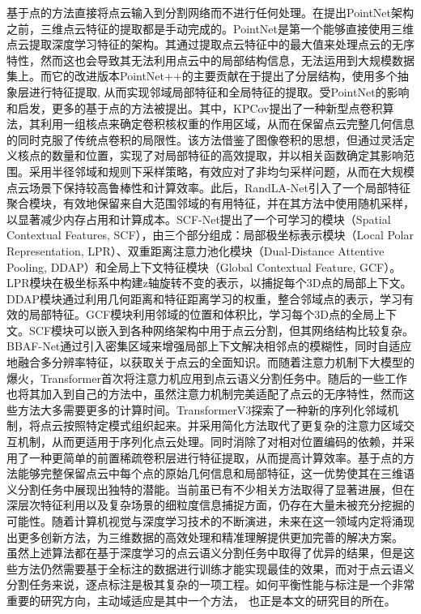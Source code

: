 基于点的方法直接将点云输入到分割网络而不进行任何处理。在提出PointNet架构之前，三维点云特征的提取都是手动完成的。PointNet是第一个能够直接使用三维点云提取深度学习特征的架构。其通过提取点云特征中的最大值来处理点云的无序特性，然而这也会导致其无法利用点云中的局部结构信息，无法运用到大规模数据集上。而它的改进版本PointNet++的主要贡献在于提出了分层结构，使用多个抽象层进行特征提取, 从而实现邻域局部特征和全局特征的提取。受PointNet的影响和启发，更多的基于点的方法被提出。其中，KPCov提出了一种新型点卷积算法，其利用一组核点来确定卷积核权重的作用区域，从而在保留点云完整几何信息的同时克服了传统点卷积的局限性。该方法借鉴了图像卷积的思想，但通过灵活定义核点的数量和位置，实现了对局部特征的高效提取，并以相关函数确定其影响范围。采用半径邻域和规则下采样策略，有效应对了非均匀采样问题，从而在大规模点云场景下保持较高鲁棒性和计算效率。此后，RandLA-Net引入了一个局部特征聚合模块，有效地保留来自大范围邻域的有用特征，并在其方法中使用随机采样，以显著减少内存占用和计算成本。SCF-Net提出了一个可学习的模块（Spatial Contextual Features, SCF），由三个部分组成：局部极坐标表示模块（Local Polar Representation, LPR）、双重距离注意力池化模块（Dual-Distance Attentive Pooling, DDAP）和全局上下文特征模块（Global Contextual Feature, GCF）。LPR模块在极坐标系中构建z轴旋转不变的表示，以捕捉每个3D点的局部上下文。DDAP模块通过利用几何距离和特征距离学习的权重，整合邻域点的表示，学习有效的局部特征。GCF模块利用邻域的位置和体积比，学习每个3D点的全局上下文。SCF模块可以嵌入到各种网络架构中用于点云分割，但其网络结构比较复杂。BBAF-Net通过引入密集区域来增强局部上下文解决相邻点的模糊性，同时自适应地融合多分辨率特征，以获取关于点云的全面知识。而随着注意力机制下大模型的爆火，Transformer首次将注意力机应用到点云语义分割任务中。随后的一些工作也将其加入到自己的方法中，虽然注意力机制完美适配了点云的无序特性，然而这些方法大多需要更多的计算时间。TransformerV3探索了一种新的序列化邻域机制，将点云按照特定模式组织起来。并采用简化方法取代了更复杂的注意力区域交互机制，从而更适用于序列化点云处理。同时消除了对相对位置编码的依赖，并采用了一种更简单的前置稀疏卷积层进行特征提取，从而提高计算效率。基于点的方法能够完整保留点云中每个点的原始几何信息和局部特征，这一优势使其在三维语义分割任务中展现出独特的潜能。当前虽已有不少相关方法取得了显著进展，但在深层次特征利用以及复杂场景的细粒度信息捕捉方面，仍存在大量未被充分挖掘的可能性。随着计算机视觉与深度学习技术的不断演进，未来在这一领域内定将涌现出更多创新方法，为三维数据的高效处理和精准理解提供更加完善的解决方案。
虽然上述算法都在基于深度学习的点云语义分割任务中取得了优异的结果，但是这些方法仍然需要基于全标注的数据进行训练才能实现最佳的效果，而对于点云语义分割任务来说，逐点标注是极其复杂的一项工程。如何平衡性能与标注是一个非常重要的研究方向，主动域适应是其中一个方法， 也正是本文的研究目的所在。

